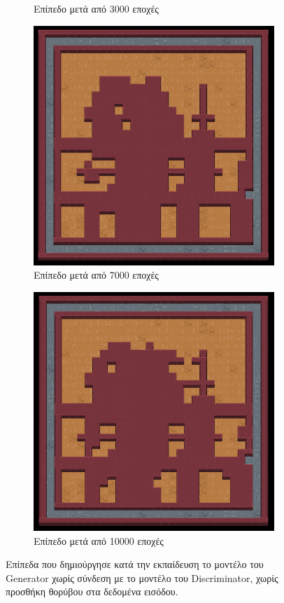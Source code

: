 \begin{figure}[H]
\begin{subfigure}{.5\textwidth}
  \caption{Επίπεδο μετά από 3000 εποχές}
  \label{fig:sfig2}
\end{subfigure}
\begin{subfigure}{.5\textwidth}
  \centering
  \includegraphics[width=.8\linewidth]{../images/result_images/dense-gan/generator_7000.png}
  \caption{Επίπεδο μετά από 7000 εποχές}
  \label{fig:sfig2}
\end{subfigure}
\begin{subfigure}{.5\textwidth}
  \centering
  \includegraphics[width=.8\linewidth]{../images/result_images/dense-gan/generator_10000.png}
  \caption{Επίπεδο μετά από 10000 εποχές}
  \label{fig:sfig2}
\end{subfigure}
\caption{Επίπεδα που δημιούργησε κατά την εκπαίδευση το μοντέλο του Generator χωρίς σύνδεση με το μοντέλο του Discriminator, χωρίς προσθήκη θορύβου στα δεδομένα εισόδου.}
\label{fig:fig}
\end{figure}

